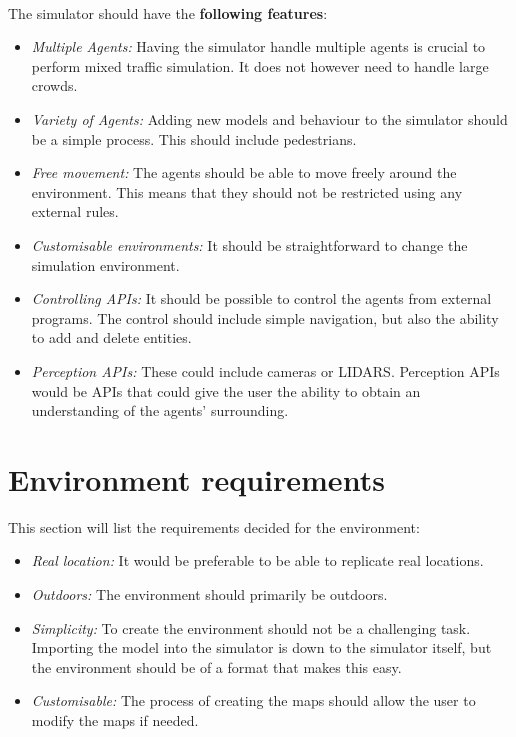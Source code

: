\paragraph{}The simulator should have the \textbf{following features}:
\begin{itemize}
    \item \emph{Multiple Agents:} Having the simulator handle multiple agents is crucial to perform mixed traffic simulation. It does not however need to handle large crowds.  
    \item \emph{Variety of Agents:} Adding new models and behaviour to the simulator should be a simple process. This should include pedestrians. 
    \item \emph{Free movement:} The agents should be able to move freely around the environment. This means that they should not be restricted using any external rules. 
    \item \emph{Customisable environments:} It should be straightforward to change the simulation environment. 
    \item \emph{Controlling APIs:} It should be possible to control the agents from external programs. The control should include simple navigation, but also the ability to add and delete entities. 
    \item \emph{Perception APIs:} These could include cameras or LIDARS. Perception APIs would be APIs that could give the user the ability to obtain an understanding of the agents' surrounding. 
\end{itemize}


\section{Environment requirements}
This section will list the requirements decided for the environment:
\begin{itemize}
\item \emph{Real location:} It would be preferable to be able to replicate real locations. 
\item \emph{Outdoors:} The environment should primarily be outdoors.
\item \emph{Simplicity:} To create the environment should not be a challenging task. Importing the model into the simulator is down to the simulator itself, but the environment should be of a format that makes this easy. 
\item \emph{Customisable:} The process of creating the maps should allow the user to modify the maps if needed. 
\end{itemize}

